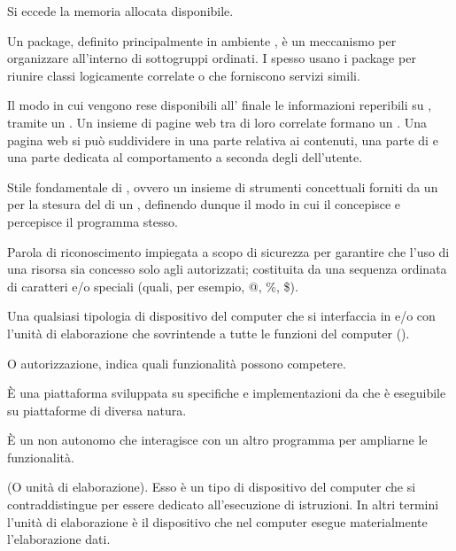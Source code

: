 {Si eccede la memoria allocata disponibile.}


{Un package, definito principalmente in ambiente , è un meccanismo per organizzare  all'interno di sottogruppi ordinati. I  spesso usano i package per riunire classi logicamente correlate o che forniscono servizi simili.}

{Il modo in cui vengono rese disponibili all' finale le informazioni reperibili su , tramite un  . Un insieme di pagine web tra di loro correlate formano un . Una pagina web si può suddividere in una parte relativa ai contenuti, una parte di  e una parte dedicata al comportamento a seconda degli  dell'utente.
}

{Stile fondamentale di , ovvero un insieme di strumenti concettuali forniti da un  per la stesura del  di un , definendo dunque il modo in cui il  concepisce e percepisce il programma stesso.}

{Parola di riconoscimento impiegata a scopo di sicurezza per garantire che l'uso di una risorsa sia concesso solo agli  autorizzati; costituita da una sequenza ordinata di caratteri  e/o speciali (quali, per esempio, @, \%, \$).}

{Una qualsiasi tipologia di dispositivo  del computer che si interfaccia in  e/o  con l'unità di elaborazione che sovrintende a tutte le funzioni del computer ().}

{O autorizzazione, indica quali funzionalità possono competere.}

{\`{E} una piattaforma  sviluppata su specifiche e implementazioni da  che è eseguibile su piattaforme  di diversa natura.}

{\`{E} un  non autonomo che interagisce con un altro programma per ampliarne le funzionalità.}

{(O unità di elaborazione). Esso è un tipo di dispositivo  del computer che si contraddistingue per essere dedicato all'esecuzione di istruzioni. In altri termini l'unità di elaborazione è il dispositivo che nel computer esegue materialmente l'elaborazione dati.}

